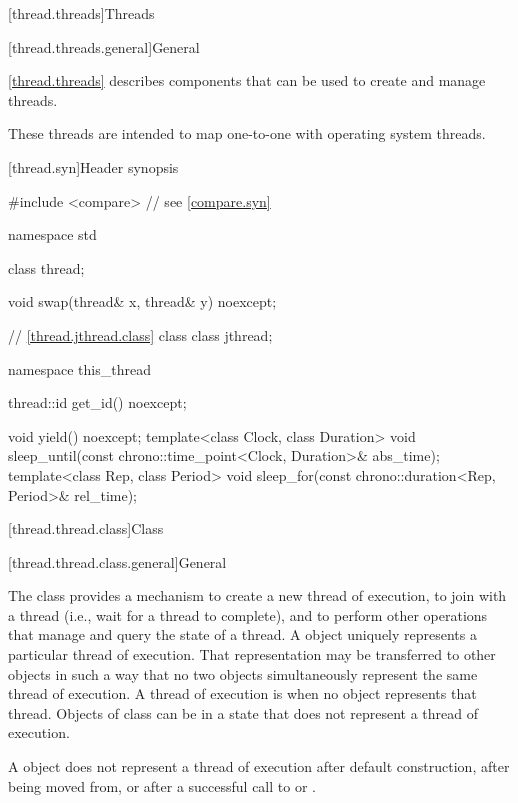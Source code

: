 [thread.threads]{Threads}

[thread.threads.general]{General}

\pnum
\ref{thread.threads} describes components that can be used to create and manage threads.
\begin{note}
These threads are intended to map one-to-one with operating system threads.
\end{note}

[thread.syn]{Header  synopsis}

%
\begin{codeblock}
#include <compare>              // see \ref{compare.syn}

namespace std {
  class thread;

  void swap(thread& x, thread& y) noexcept;

  // \ref{thread.jthread.class} class 
  class jthread;

  namespace this_thread {
    thread::id get_id() noexcept;

    void yield() noexcept;
    template<class Clock, class Duration>
      void sleep_until(const chrono::time_point<Clock, Duration>& abs_time);
    template<class Rep, class Period>
      void sleep_for(const chrono::duration<Rep, Period>& rel_time);
  }
}
\end{codeblock}

[thread.thread.class]{Class }

[thread.thread.class.general]{General}

\pnum
The class  provides a mechanism to create a new thread of execution, to join with
a thread (i.e., wait for a thread to complete), and to perform other operations that manage and
query the state of a thread. A  object uniquely represents a particular thread of
execution. That representation may be transferred to other  objects in such a way
that no two  objects simultaneously represent the same thread of execution. A
thread of execution is  when no  object represents that thread.
Objects of class  can be in a state that does not represent a thread of
execution.
\begin{note}
A  object does not represent a thread of execution after
default construction, after being moved from, or after a successful call to  or
.
\end{note}

